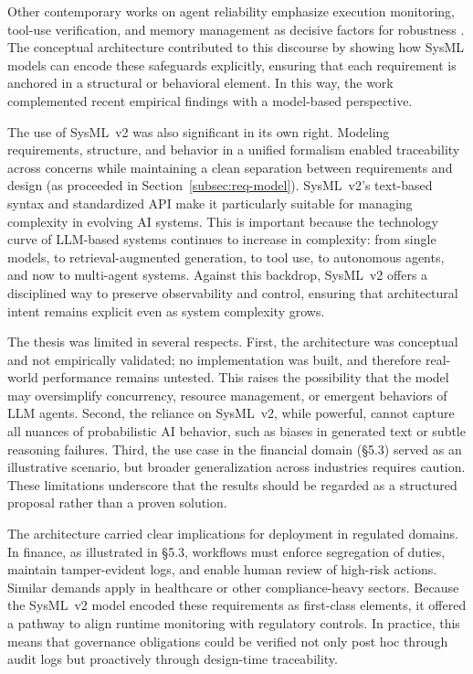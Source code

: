 Other contemporary works on agent reliability emphasize execution monitoring, tool-use verification, and memory management as decisive factors for robustness \parencite{wangCodingAgents2024,goebelAgentPlanning2025}. The conceptual architecture contributed to this discourse by showing how SysML models can encode these safeguards explicitly, ensuring that each requirement is anchored in a structural or behavioral element. In this way, the work complemented recent empirical findings with a model-based perspective.

The use of SysML~v2 was also significant in its own right. Modeling requirements, structure, and behavior in a unified formalism enabled traceability across concerns while maintaining a clean separation between requirements and design (as proceeded in Section~\ref{subsec:req-model}). SysML~v2's text-based syntax and standardized API make it particularly suitable for managing complexity in evolving AI systems. This is important because the technology curve of LLM-based systems continues to increase in complexity: from single models, to retrieval-augmented generation, to tool use, to autonomous agents, and now to multi-agent systems. Against this backdrop, SysML~v2 offers a disciplined way to preserve observability and control, ensuring that architectural intent remains explicit even as system complexity grows.

The thesis was limited in several respects. First, the architecture was conceptual and not empirically validated; no implementation was built, and therefore real-world performance remains untested. This raises the possibility that the model may oversimplify concurrency, resource management, or emergent behaviors of LLM agents. Second, the reliance on SysML~v2, while powerful, cannot capture all nuances of probabilistic AI behavior, such as biases in generated text or subtle reasoning failures. Third, the use case in the financial domain (§5.3) served as an illustrative scenario, but broader generalization across industries requires caution. These limitations underscore that the results should be regarded as a structured proposal rather than a proven solution.

The architecture carried clear implications for deployment in regulated domains. In finance, as illustrated in §5.3, workflows must enforce segregation of duties, maintain tamper-evident logs, and enable human review of high-risk actions. Similar demands apply in healthcare or other compliance-heavy sectors. Because the SysML~v2 model encoded these requirements as first-class elements, it offered a pathway to align runtime monitoring with regulatory controls. In practice, this means that governance obligations could be verified not only post hoc through audit logs but proactively through design-time traceability.

